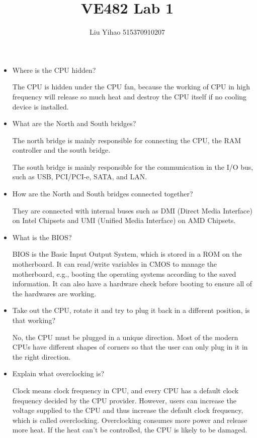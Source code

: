 \documentclass{article}
\title{VE482 Lab 1}
\author{Liu Yihao 515370910207}
\date{}
\begin{document}
\maketitle

\begin{itemize}
\item Where is the CPU hidden?

The CPU is hidden under the CPU fan, because the working of CPU in high frequency will release so much heat and destroy the CPU itself if no cooling device is installed. 

\item What are the North and South bridges?

The north bridge is mainly responsible for connecting the CPU, the RAM controller and the south bridge.

The south bridge is mainly responsible for the communication in the I/O bus, such as USB, PCI/PCI-e, SATA, and LAN.

\item How are the North and South bridges connected together?

They are connected with internal buses such as DMI (Direct Media Interface) on Intel Chipsets and UMI (Unified Media Interface) on AMD Chipsets.

\item What is the BIOS?

BIOS is the Basic Input Output System, which is stored in a ROM on the motherboard. It can read/write variables in CMOS to manage the motherboard, e.g., booting the operating systems according to the saved information. It can also have a hardware check before booting to ensure all of the hardwares are working.

\item Take out the CPU, rotate it and try to plug it back in a different position, is that working?

No, the CPU must be plugged in a unique direction. Most of the modern CPUs have different shapes of corners so that the user can only plug in it in the right direction.

\item Explain what overclocking is?

Clock means clock frequency in CPU, and every CPU has a default clock frequency decided by the CPU provider. However, users can increase the voltage supplied to the CPU and thus increase the default clock frequency, which is called overclocking. Overclocking consumes more power and release more heat. If the heat can't be controlled, the CPU is likely to be damaged.


\end{itemize}
\end{document}
